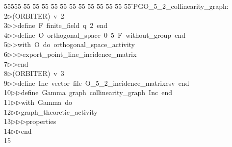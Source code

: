 %
%
\begin{tabbing}
55555 \= 55 \= 55 \= 55 \= 55 \= 55 \= 55 \= 55 \= 55 \= 55 \= 55 \= 55 \= 55 \= \>PGO\_5\_2\_collinearity\_graph:\\[0pt]
2\>$\triangleright$\>(ORBITER)\ v\ 2\ \\[0pt]
3\>$\triangleright$\>$\triangleright$\>define\ F\ finite\_field\ q\ 2\ end\ \\[0pt]
4\>$\triangleright$\>$\triangleright$\>define\ O\ orthogonal\_space\ 0\ 5\ F\ without\_group\ end\ \\[0pt]
5\>$\triangleright$\>$\triangleright$\>with\ O\ do\ orthogonal\_space\_activity\ \\[0pt]
6\>$\triangleright$\>$\triangleright$\>$\triangleright$\>export\_point\_line\_incidence\_matrix\ \\[0pt]
7\>$\triangleright$\>$\triangleright$\>end\\[0pt]
8\>$\triangleright$\>(ORBITER)\ v\ 3\ \\[0pt]
9\>$\triangleright$\>$\triangleright$\>define\ Inc\ vector\ file\ O\_5\_2\_incidence\_matrixcsv\ end\ \\[0pt]
10\>$\triangleright$\>$\triangleright$\>define\ Gamma\ graph\ collinearity\_graph\ Inc\ end\ \\[0pt]
11\>$\triangleright$\>$\triangleright$\>with\ Gamma\ do\ \\[0pt]
12\>$\triangleright$\>$\triangleright$\>graph\_theoretic\_activity\ \\[0pt]
13\>$\triangleright$\>$\triangleright$\>$\triangleright$\>properties\ \\[0pt]
14\>$\triangleright$\>$\triangleright$\>end\\[0pt]
15\>\end{tabbing}
